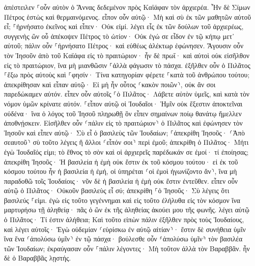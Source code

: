 \documentclass[twoside, 9pt]{extreport}
\begin{document}
ἀπέστειλεν ⸀οὖν αὐτὸν ὁ Ἅννας δεδεμένον πρὸς Καϊάφαν τὸν ἀρχιερέα. 
Ἦν δὲ Σίμων Πέτρος ἑστὼς καὶ θερμαινόμενος. εἶπον οὖν αὐτῷ· Μὴ καὶ σὺ ἐκ τῶν μαθητῶν αὐτοῦ εἶ; ⸀ἠρνήσατο ἐκεῖνος καὶ εἶπεν· Οὐκ εἰμί. 
λέγει εἷς ἐκ τῶν δούλων τοῦ ἀρχιερέως, συγγενὴς ὢν οὗ ἀπέκοψεν Πέτρος τὸ ὠτίον· Οὐκ ἐγώ σε εἶδον ἐν τῷ κήπῳ μετ᾽ αὐτοῦ; 
πάλιν οὖν ⸀ἠρνήσατο Πέτρος· καὶ εὐθέως ἀλέκτωρ ἐφώνησεν. 
Ἄγουσιν οὖν τὸν Ἰησοῦν ἀπὸ τοῦ Καϊάφα εἰς τὸ πραιτώριον· ἦν δὲ πρωΐ· καὶ αὐτοὶ οὐκ εἰσῆλθον εἰς τὸ πραιτώριον, ἵνα μὴ μιανθῶσιν ⸀ἀλλὰ φάγωσιν τὸ πάσχα. 
ἐξῆλθεν οὖν ὁ Πιλᾶτος ⸀ἔξω πρὸς αὐτοὺς καὶ ⸀φησίν· Τίνα κατηγορίαν φέρετε ⸀κατὰ τοῦ ἀνθρώπου τούτου; 
ἀπεκρίθησαν καὶ εἶπαν αὐτῷ· Εἰ μὴ ἦν οὗτος ⸂κακὸν ποιῶν⸃, οὐκ ἄν σοι παρεδώκαμεν αὐτόν. 
εἶπεν οὖν αὐτοῖς ⸀ὁ Πιλᾶτος· Λάβετε αὐτὸν ὑμεῖς, καὶ κατὰ τὸν νόμον ὑμῶν κρίνατε αὐτόν. ⸀εἶπον αὐτῷ οἱ Ἰουδαῖοι· Ἡμῖν οὐκ ἔξεστιν ἀποκτεῖναι οὐδένα· 
ἵνα ὁ λόγος τοῦ Ἰησοῦ πληρωθῇ ὃν εἶπεν σημαίνων ποίῳ θανάτῳ ἤμελλεν ἀποθνῄσκειν. 
Εἰσῆλθεν οὖν ⸂πάλιν εἰς τὸ πραιτώριον⸃ ὁ Πιλᾶτος καὶ ἐφώνησεν τὸν Ἰησοῦν καὶ εἶπεν αὐτῷ· Σὺ εἶ ὁ βασιλεὺς τῶν Ἰουδαίων; 
⸀ἀπεκρίθη Ἰησοῦς· ⸂Ἀπὸ σεαυτοῦ⸃ σὺ τοῦτο λέγεις ἢ ἄλλοι ⸂εἶπόν σοι⸃ περὶ ἐμοῦ; 
ἀπεκρίθη ὁ Πιλᾶτος· Μήτι ἐγὼ Ἰουδαῖός εἰμι; τὸ ἔθνος τὸ σὸν καὶ οἱ ἀρχιερεῖς παρέδωκάν σε ἐμοί· τί ἐποίησας; 
ἀπεκρίθη Ἰησοῦς· Ἡ βασιλεία ἡ ἐμὴ οὐκ ἔστιν ἐκ τοῦ κόσμου τούτου· εἰ ἐκ τοῦ κόσμου τούτου ἦν ἡ βασιλεία ἡ ἐμή, οἱ ὑπηρέται ⸂οἱ ἐμοὶ ἠγωνίζοντο ἄν⸃, ἵνα μὴ παραδοθῶ τοῖς Ἰουδαίοις· νῦν δὲ ἡ βασιλεία ἡ ἐμὴ οὐκ ἔστιν ἐντεῦθεν. 
εἶπεν οὖν αὐτῷ ὁ Πιλᾶτος· Οὐκοῦν βασιλεὺς εἶ σύ; ἀπεκρίθη ⸀ὁ Ἰησοῦς· Σὺ λέγεις ὅτι βασιλεύς ⸀εἰμι. ἐγὼ εἰς τοῦτο γεγέννημαι καὶ εἰς τοῦτο ἐλήλυθα εἰς τὸν κόσμον ἵνα μαρτυρήσω τῇ ἀληθείᾳ· πᾶς ὁ ὢν ἐκ τῆς ἀληθείας ἀκούει μου τῆς φωνῆς. 
λέγει αὐτῷ ὁ Πιλᾶτος· Τί ἐστιν ἀλήθεια; Καὶ τοῦτο εἰπὼν πάλιν ἐξῆλθεν πρὸς τοὺς Ἰουδαίους, καὶ λέγει αὐτοῖς· Ἐγὼ οὐδεμίαν ⸂εὑρίσκω ἐν αὐτῷ αἰτίαν⸃· 
ἔστιν δὲ συνήθεια ὑμῖν ἵνα ἕνα ⸂ἀπολύσω ὑμῖν⸃ ἐν τῷ πάσχα· βούλεσθε οὖν ⸄ἀπολύσω ὑμῖν⸅ τὸν βασιλέα τῶν Ἰουδαίων; 
ἐκραύγασαν οὖν ⸀πάλιν λέγοντες· Μὴ τοῦτον ἀλλὰ τὸν Βαραββᾶν. ἦν δὲ ὁ Βαραββᾶς λῃστής. 
\end{document}
